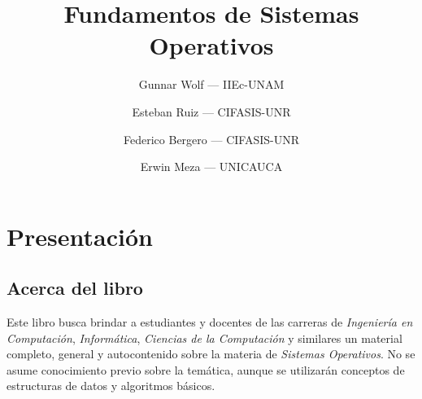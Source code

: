 \documentclass[11pt,fleqn]{book} %
\title{Fundamentos de Sistemas Operativos}
\author{Gunnar Wolf — IIEc-UNAM \and Esteban Ruiz — CIFASIS-UNR \and Federico Bergero — CIFASIS-UNR \and Erwin Meza — UNICAUCA}
\date{}
\begin{document}






\pagestyle{empty} 


\pagestyle{empty} %

\tableofcontents %

\cleardoublepage %

\pagestyle{fancy} %












\chapter{Presentación}

\section{Acerca del libro}

Este libro busca brindar a estudiantes y docentes de las carreras de
\emph{Ingeniería en Computación}, \emph{Informática}, \emph{Ciencias de la Computación} y similares un material completo, general y autocontenido
sobre la materia de \emph{Sistemas Operativos}. No se asume conocimiento
previo sobre la temática, aunque se utilizarán conceptos de
estructuras de datos y algoritmos básicos.
\end{document}
